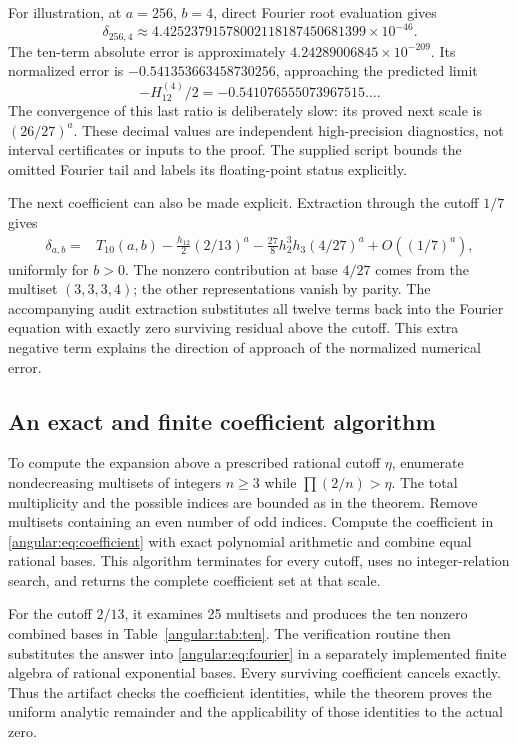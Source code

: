 For illustration, at $a=256$, $b=4$, direct Fourier root evaluation
gives
\[
 \delta_{256,4}\approx4.42523791578002118187450681399\times10^{-46}.
\]
The ten-term absolute error is approximately $4.24289006845\times10^{-209}$.
Its normalized error is $-0.541353663458730256$, approaching the
predicted limit
\[
 -H_{12}^{(4)}/2=-0.541076555073967515\ldots.
\]
The convergence of this last ratio is deliberately slow: its proved
next scale is $(26/27)^a$.  These decimal values are independent
high-precision diagnostics, not interval certificates or inputs to
the proof.  The supplied script bounds the omitted Fourier tail and
labels its floating-point status explicitly.

The next coefficient can also be made explicit. Extraction through the
cutoff $1/7$ gives
\begin{align*}
 \delta_{a,b}={}&T_{10}(a,b)-\frac{h_{12}}2(2/13)^a
 -\frac{27}{8}h_2^3h_3(4/27)^a+O((1/7)^a),
\end{align*}
uniformly for $b>0$. The nonzero contribution at base $4/27$ comes
from the multiset $(3,3,3,4)$; the other representations vanish by
parity. The accompanying audit extraction substitutes all twelve
terms back into the Fourier equation with exactly zero surviving
residual above the cutoff. This extra negative term explains the
direction of approach of the normalized numerical error.

\subsection{An exact and finite coefficient algorithm}

To compute the expansion above a prescribed rational cutoff $\eta$,
enumerate nondecreasing multisets of integers $n\geq3$ while
$\prod(2/n)>\eta$.  The total multiplicity and the possible indices
are bounded as in the theorem. Remove multisets containing an even
number of odd indices. Compute the coefficient in
\eqref{angular:eq:coefficient} with exact polynomial arithmetic and
combine equal rational bases. This algorithm terminates for every
cutoff, uses no integer-relation search, and returns the complete
coefficient set at that scale.

For the cutoff $2/13$, it examines 25 multisets and produces the ten
nonzero combined bases in Table~\ref{angular:tab:ten}. The verification
routine then substitutes the answer into \eqref{angular:eq:fourier}
in a separately implemented finite algebra of rational exponential
bases. Every surviving coefficient cancels exactly. Thus the artifact
checks the coefficient identities, while the theorem proves the
uniform analytic remainder and the applicability of those identities
to the actual zero.
